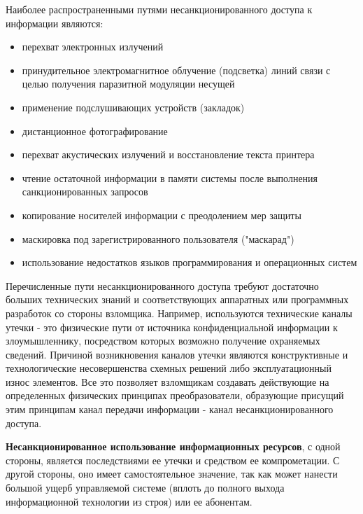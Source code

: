 Наиболее распространенными путями несанкционированного доступа к информации являются:
\begin{itemize}
    \item перехват электронных излучений
    \item принудительное электромагнитное облучение (подсветка) линий связи с целью получения
        паразитной модуляции несущей
    \item применение подслушивающих устройств (закладок)
    \item дистанционное фотографирование
    \item перехват акустических излучений и восстановление текста принтера
    \item чтение остаточной информации в памяти системы после выполнения санкционированных запросов
    \item копирование носителей информации с преодолением мер защиты
    \item маскировка под зарегистрированного пользователя ("маскарад")
    \item использование недостатков языков программирования и операционных систем
\end{itemize}

Перечисленные пути несанкционированного доступа требуют достаточно больших технических знаний и
соответствующих аппаратных или программных разработок со стороны взломщика. Например, используются
технические каналы утечки - это физические пути от источника конфиденциальной информации к
злоумышленнику, посредством которых возможно получение охраняемых сведений. Причиной возникновения
каналов утечки являются конструктивные и технологические несовершенства схемных решений либо
эксплуатационный износ элементов. Все это позволяет взломщикам создавать действующие на определенных
физических принципах преобразователи, образующие присущий этим принципам канал передачи информации
- канал несанкционированного доступа.

\textbf{Несанкционированное использование информационных ресурсов}, с одной стороны, является
последствиями ее утечки и средством ее компрометации. С другой стороны, оно имеет самостоятельное
значение, так как может нанести большой ущерб управляемой системе (вплоть до полного выхода
информационной технологии из строя) или ее абонентам.

